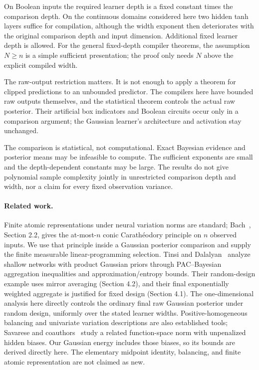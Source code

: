 \documentclass[11pt]{article}
\theoremstyle{remark}\newtheorem{remark}[theorem]{Remark}
\begin{document}
On Boolean inputs the required learner depth is a fixed constant times
the comparison depth. On the continuous domains considered here two
hidden tanh layers suffice for compilation, although the width exponent
then deteriorates with the original comparison depth and input
dimension. Additional fixed learner depth is allowed. For the general fixed-depth compiler theorems, the assumption
$N\ge n$ is a simple sufficient presentation; the proof only needs
$N$ above the explicit compiled width.

The raw-output restriction matters. It is not enough to apply a theorem
for clipped predictions to an unbounded predictor. The compilers here
have bounded raw outputs themselves, and the statistical theorem
controls the actual raw posterior. Their artificial box indicators and
Boolean circuits occur only in a comparison argument; the Gaussian
learner's architecture and activation stay unchanged.

The comparison is statistical, not computational. Exact Bayesian
evidence and posterior means may be infeasible to compute. The
sufficient exponents are small and the depth-dependent constants may
be large. The results do not give polynomial sample complexity jointly
in unrestricted comparison depth and width, nor a claim for every
fixed observation variance.

\paragraph{Related work.}
Finite atomic representations under neural variation norms are standard;
Bach~\cite{bach-convex}, Section 2.2, gives the at-most-$n$ conic
Carath\'eodory principle on $n$ observed inputs. We use that principle
inside a Gaussian posterior comparison and supply the finite measurable
linear-programming selection. Tinsi and Dalalyan~\cite{tinsi-dalalyan}
analyze shallow networks with product Gaussian priors through
PAC--Bayesian aggregation inequalities and approximation/entropy bounds.
Their random-design example uses mirror averaging (Section 4.2), and
their final exponentially weighted aggregate is justified for fixed
design (Section 4.1). The one-dimensional analysis here directly
controls the ordinary final raw Gaussian posterior under random design,
uniformly over the stated learner widths. Positive-homogeneous balancing and univariate variation descriptions
are also established tools; Savarese and coauthors~\cite{savarese}
study a related function-space norm with unpenalized hidden biases.
Our Gaussian energy includes those biases, so its bounds are derived
directly here. The elementary midpoint identity, balancing, and finite
atomic representation are not claimed as new.
\end{document}
